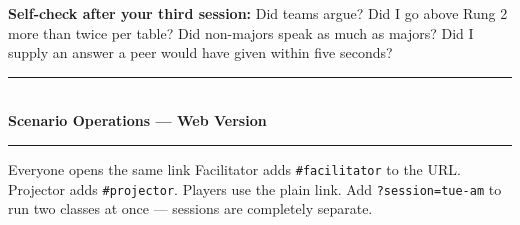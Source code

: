 \documentclass[9pt,letterpaper]{extarticle}
\begin{document}
\vspace{0.4em}
{\footnotesize\color{deep}\textbf{Self-check after your third session:} Did teams
argue? Did I go above Rung 2 more than twice per table? Did non-majors speak as
much as majors? Did I supply an answer a peer would have given within five
seconds?}


\newpage
{\color{deep}\rule{\textwidth}{1.5pt}}\\[0.3em]
{\LARGE\bfseries\color{deep} Scenario Operations --- Web Version}\\[0.2em]
{\color{deep}\rule{\textwidth}{1.5pt}}

\vspace{0.5em}
\begin{graybox}{Everyone opens the same link}
Facilitator adds \texttt{\#facilitator} to the URL. Projector adds
\texttt{\#projector}. Players use the plain link. Add \texttt{?session=tue-am}
to run two classes at once --- sessions are completely separate.
\end{graybox}
\end{document}
